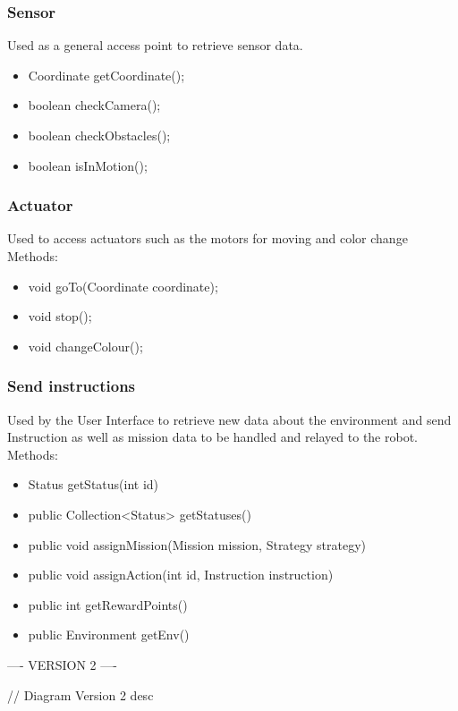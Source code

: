 \subsubsection{Sensor}
Used as a general access point to retrieve sensor data.
	\begin{itemize}
	    \item Coordinate getCoordinate();
	    \item boolean checkCamera();
	    \item boolean checkObstacles();
        \item boolean isInMotion();
	\end{itemize}
    
\subsubsection{Actuator}
Used to access actuators such as the motors for moving and color change
Methods:
\begin{itemize}
    \item void goTo(Coordinate coordinate);
	\item void stop();
	\item void changeColour();
\end{itemize}

\subsubsection{Send instructions}
Used by the User Interface to retrieve new data about the environment and send Instruction as well as mission data to be handled and relayed to the robot.
Methods:
\begin{itemize}
    \item Status getStatus(int id)
    \item public Collection<Status> getStatuses()
    \item public void assignMission(Mission mission, Strategy strategy)
    \item public void assignAction(int id, Instruction instruction)
    \item public int getRewardPoints() 
    \item public Environment getEnv()
\end{itemize}


---- VERSION 2 ----

// Diagram Version 2 desc
